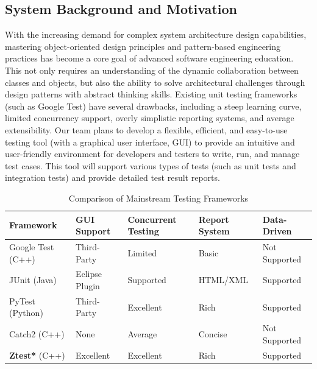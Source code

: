 \documentclass{article}
\begin{document}
\subsection{System Background and Motivation}
With the increasing demand for complex system architecture design capabilities, mastering object-oriented design principles and pattern-based engineering practices has become a core goal of advanced software engineering education. This not only requires an understanding of the dynamic collaboration between classes and objects, but also the ability to solve architectural challenges through design patterns with abstract thinking skills.
Existing unit testing frameworks (such as Google Test) have several drawbacks, including a steep learning curve, limited concurrency support, overly simplistic reporting systems, and average extensibility. Our team plans to develop a flexible, efficient, and easy-to-use testing tool (with a graphical user interface, GUI) to provide an intuitive and user-friendly environment for developers and testers to write, run, and manage test cases. This tool will support various types of tests (such as unit tests and integration tests) and provide detailed test result reports.
\begin{table}[h]
    \centering
    \caption{Comparison of Mainstream Testing Frameworks}
    \label{tab:compare}
    \begin{tabularx}{\textwidth}{lXXXX}
        \toprule
        \textbf{Framework}       & \textbf{GUI Support} & \textbf{Concurrent Testing} & \textbf{Report System} & \textbf{Data-Driven} \\
        \midrule
        Google Test (C++)        & Third-Party          & Limited                     & Basic                  & Not Supported        \\
        JUnit    (Java)          & Eclipse Plugin       & Supported                   & HTML/XML               & Supported            \\
        PyTest (Python)          & Third-Party          & Excellent                   & Rich                   & Supported            \\
        Catch2   (C++)           & None                 & Average                     & Concise                & Not Supported        \\
        \textbf{Ztest*}    (C++) & Excellent            & Excellent                   & Rich                   & Supported            \\
        \bottomrule
    \end{tabularx}
\end{table}
\end{document}
